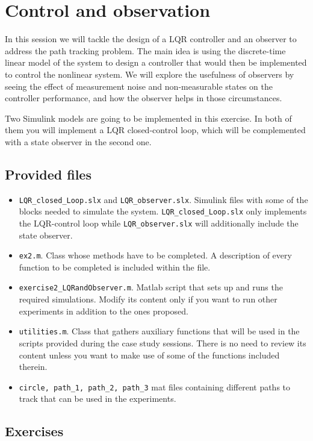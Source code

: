 \setcounter{chapter}{1}
\chapter{Control and observation}
In this session we will tackle the design of a LQR controller and an observer to address the path tracking problem.
The main idea is using the discrete-time linear model of the system to design a controller that would then be implemented to control the nonlinear system. 
We will explore the usefulness of observers by seeing the effect of measurement noise and non-measurable states on the controller performance, and how the observer helps in those circumstances.\par
%
Two Simulink models are going to be implemented in this exercise. 
In both of them you will implement a LQR closed-control loop, which will be complemented with a state observer in the second one.
\section{Provided files}
\begin{itemize}
	\setlength\itemsep{0em}
	\item \texttt{LQR\_closed\_Loop.slx} and \texttt{LQR\_observer.slx}.
		Simulink files with some of the blocks needed to simulate the system.
		\texttt{LQR\_closed\_Loop.slx} only implements the LQR-control loop while \texttt{LQR\_observer.slx} will additionally include the state observer.
	\item \texttt{ex2.m}.
		Class whose methods have to be completed.
		A description of every function to be completed is included within the file.
	\item \texttt{exercise2\_LQRandObserver.m}.
		Matlab script that sets up and runs the required simulations.
		Modify its content only if you want to run other experiments in addition to the ones proposed.
	\item \texttt{utilities.m}.
		Class that gathers auxiliary functions that will be used in the scripts provided during the case study sessions.
		There is no need to review its content unless you want to make use of some of the functions included therein.
	\item \texttt{circle, path\_1, path\_2, path\_3} mat files containing different paths to track that can be used in the experiments.
\end{itemize}
%
\section{Exercises}
